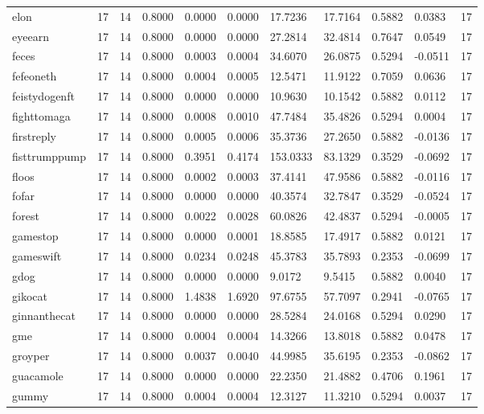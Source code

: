 \begin{table}[htbp]
\begin{tabular}{lllllllllll}
elon & 17 & 14 & 0.8000 & 0.0000 & 0.0000 & 17.7236 & 17.7164 & 0.5882 & 0.0383 & 17 \\
eyeearn & 17 & 14 & 0.8000 & 0.0000 & 0.0000 & 27.2814 & 32.4814 & 0.7647 & 0.0549 & 17 \\
feces & 17 & 14 & 0.8000 & 0.0003 & 0.0004 & 34.6070 & 26.0875 & 0.5294 & -0.0511 & 17 \\
fefeoneth & 17 & 14 & 0.8000 & 0.0004 & 0.0005 & 12.5471 & 11.9122 & 0.7059 & 0.0636 & 17 \\
feistydogenft & 17 & 14 & 0.8000 & 0.0000 & 0.0000 & 10.9630 & 10.1542 & 0.5882 & 0.0112 & 17 \\
fighttomaga & 17 & 14 & 0.8000 & 0.0008 & 0.0010 & 47.7484 & 35.4826 & 0.5294 & 0.0004 & 17 \\
firstreply & 17 & 14 & 0.8000 & 0.0005 & 0.0006 & 35.3736 & 27.2650 & 0.5882 & -0.0136 & 17 \\
fisttrumppump & 17 & 14 & 0.8000 & 0.3951 & 0.4174 & 153.0333 & 83.1329 & 0.3529 & -0.0692 & 17 \\
floos & 17 & 14 & 0.8000 & 0.0002 & 0.0003 & 37.4141 & 47.9586 & 0.5882 & -0.0116 & 17 \\
fofar & 17 & 14 & 0.8000 & 0.0000 & 0.0000 & 40.3574 & 32.7847 & 0.3529 & -0.0524 & 17 \\
forest & 17 & 14 & 0.8000 & 0.0022 & 0.0028 & 60.0826 & 42.4837 & 0.5294 & -0.0005 & 17 \\
gamestop & 17 & 14 & 0.8000 & 0.0000 & 0.0001 & 18.8585 & 17.4917 & 0.5882 & 0.0121 & 17 \\
gameswift & 17 & 14 & 0.8000 & 0.0234 & 0.0248 & 45.3783 & 35.7893 & 0.2353 & -0.0699 & 17 \\
gdog & 17 & 14 & 0.8000 & 0.0000 & 0.0000 & 9.0172 & 9.5415 & 0.5882 & 0.0040 & 17 \\
gikocat & 17 & 14 & 0.8000 & 1.4838 & 1.6920 & 97.6755 & 57.7097 & 0.2941 & -0.0765 & 17 \\
ginnanthecat & 17 & 14 & 0.8000 & 0.0000 & 0.0000 & 28.5284 & 24.0168 & 0.5294 & 0.0290 & 17 \\
gme & 17 & 14 & 0.8000 & 0.0004 & 0.0004 & 14.3266 & 13.8018 & 0.5882 & 0.0478 & 17 \\
groyper & 17 & 14 & 0.8000 & 0.0037 & 0.0040 & 44.9985 & 35.6195 & 0.2353 & -0.0862 & 17 \\
guacamole & 17 & 14 & 0.8000 & 0.0000 & 0.0000 & 22.2350 & 21.4882 & 0.4706 & 0.1961 & 17 \\
gummy & 17 & 14 & 0.8000 & 0.0004 & 0.0004 & 12.3127 & 11.3210 & 0.5294 & 0.0037 & 17 \\

\end{tabular}
\end{table}
